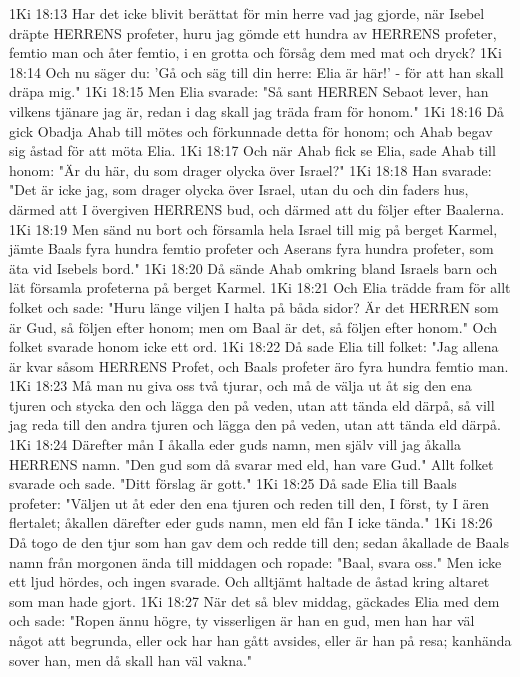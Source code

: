 1Ki 18:13  Har det icke blivit berättat för min herre vad jag gjorde, när Isebel dräpte HERRENS profeter, huru jag gömde ett hundra av HERRENS profeter, femtio man och åter femtio, i en grotta och försåg dem med mat och dryck?
1Ki 18:14  Och nu säger du: 'Gå och säg till din herre: Elia är här!' - för att han skall dräpa mig."
1Ki 18:15  Men Elia svarade: "Så sant HERREN Sebaot lever, han vilkens tjänare jag är, redan i dag skall jag träda fram för honom."
1Ki 18:16  Då gick Obadja Ahab till mötes och förkunnade detta för honom; och Ahab begav sig åstad för att möta Elia.
1Ki 18:17  Och när Ahab fick se Elia, sade Ahab till honom: "Är du här, du som drager olycka över Israel?"
1Ki 18:18  Han svarade: "Det är icke jag, som drager olycka över Israel, utan du och din faders hus, därmed att I övergiven HERRENS bud, och därmed att du följer efter Baalerna.
1Ki 18:19  Men sänd nu bort och församla hela Israel till mig på berget Karmel, jämte Baals fyra hundra femtio profeter och Aserans fyra hundra profeter, som äta vid Isebels bord."
1Ki 18:20  Då sände Ahab omkring bland Israels barn och lät församla profeterna på berget Karmel.
1Ki 18:21  Och Elia trädde fram för allt folket och sade: "Huru länge viljen I halta på båda sidor? Är det HERREN som är Gud, så följen efter honom; men om Baal är det, så följen efter honom." Och folket svarade honom icke ett ord.
1Ki 18:22  Då sade Elia till folket: "Jag allena är kvar såsom HERRENS Profet, och Baals profeter äro fyra hundra femtio man.
1Ki 18:23  Må man nu giva oss två tjurar, och må de välja ut åt sig den ena tjuren och stycka den och lägga den på veden, utan att tända eld därpå, så vill jag reda till den andra tjuren och lägga den på veden, utan att tända eld därpå.
1Ki 18:24  Därefter mån I åkalla eder guds namn, men själv vill jag åkalla HERRENS namn. "Den gud som då svarar med eld, han vare Gud." Allt folket svarade och sade. "Ditt förslag är gott."
1Ki 18:25  Då sade Elia till Baals profeter: "Väljen ut åt eder den ena tjuren och reden till den, I först, ty I ären flertalet; åkallen därefter eder guds namn, men eld fån I icke tända."
1Ki 18:26  Då togo de den tjur som han gav dem och redde till den; sedan åkallade de Baals namn från morgonen ända till middagen och ropade: "Baal, svara oss." Men icke ett ljud hördes, och ingen svarade. Och alltjämt haltade de åstad kring altaret som man hade gjort.
1Ki 18:27  När det så blev middag, gäckades Elia med dem och sade: "Ropen ännu högre, ty visserligen är han en gud, men han har väl något att begrunda, eller ock har han gått avsides, eller är han på resa; kanhända sover han, men då skall han väl vakna."
